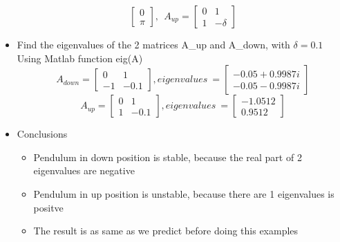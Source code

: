 \begin{itemize}
\begin{equation}
\begin{bmatrix}
        0\\ \pi  
      \end{bmatrix}
      ,~~A_{up} =  
      \begin{bmatrix}
        0 &  1 \\ 
       1 & -\delta
     \end{bmatrix}  
    \end{equation}
  \item Find the eigenvalues of the 2 matrices A\_up and A\_down, with $\delta = 0.1$
  \\Using Matlab function eig(A)
  \begin{equation}
    A_{down} =  
    \begin{bmatrix}
      0 &  1 \\ 
     -1 & -0.1
   \end{bmatrix}
   , eigenvalues~ = 
    \begin{bmatrix}
      -0.05 + 0.9987i \\ 
      -0.05 - 0.9987i
    \end{bmatrix}  
  \end{equation}
  \begin{equation}
    A_{up} =  
    \begin{bmatrix}
      0 &  1 \\ 
      1 & -0.1
   \end{bmatrix}
   , eigenvalues~ = 
    \begin{bmatrix}
      -1.0512 \\ 
      0.9512
    \end{bmatrix}  
  \end{equation}
  \item Conclusions
    \begin{itemize}
      \item Pendulum in down position is stable, because the real part of 2 eigenvalues are negative
      \item Pendulum in up position is unstable, because there are 1 eigenvalues is positve
      \item The result is as same as we predict before doing this examples
    \end{itemize}
\end{itemize}

